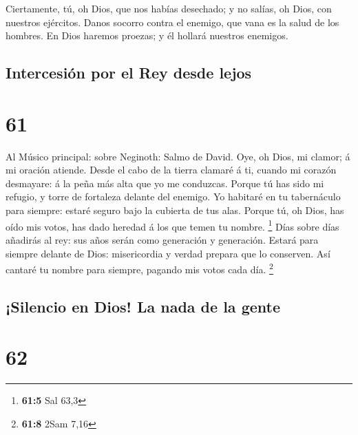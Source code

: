  Ciertamente, tú, oh Dios, que nos habías desechado; y no
salías, oh Dios, con nuestros ejércitos.  Danos socorro
contra el enemigo, que vana es la salud de los hombres.  En
Dios haremos proezas; y él hollará nuestros enemigos.

\hypertarget{intercesiuxf3n-por-el-rey-desde-lejos}{%
\subsection{Intercesión por el Rey desde
lejos}\label{intercesiuxf3n-por-el-rey-desde-lejos}}

\hypertarget{section-60}{%
\section{61}\label{section-60}}

 Al Músico principal: sobre Neginoth: Salmo de David. Oye,
oh Dios, mi clamor; á mi oración atiende.  Desde el cabo de
la tierra clamaré á ti, cuando mi corazón desmayare: á la peña más alta
que yo me conduzcas.  Porque tú has sido mi refugio, y torre
de fortaleza delante del enemigo.  Yo habitaré en tu
tabernáculo para siempre: estaré seguro bajo la cubierta de tus alas.
 Porque tú, oh Dios, has oído mis votos, has dado heredad á
los que temen tu nombre. \footnote{\textbf{61:5} Sal 63,3} 
Días sobre días añadirás al rey: sus años serán como generación y
generación.  Estará para siempre delante de Dios:
misericordia y verdad prepara que lo conserven.  Así cantaré
tu nombre para siempre, pagando mis votos cada día. \footnote{\textbf{61:8}
  2Sam 7,16}

\hypertarget{silencio-en-dios-la-nada-de-la-gente}{%
\subsection{¡Silencio en Dios! La nada de la
gente}\label{silencio-en-dios-la-nada-de-la-gente}}

\hypertarget{section-61}{%
\section{62}\label{section-61}}

